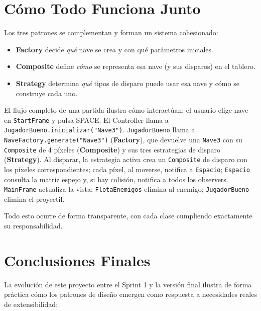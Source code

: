 \documentclass[12pt, a4paper]{article}
\begin{document}
\section{C\'{o}mo Todo Funciona Junto}
 
Los tres patrones se complementan y forman un sistema cohesionado:
 
\begin{itemize}
    \item \textbf{Factory} decide \textit{qu\'{e}} nave se crea y con qu\'{e} par\'{a}metros iniciales.
    \item \textbf{Composite} define \textit{c\'{o}mo} se representa esa nave (y sus disparos) en el tablero.
    \item \textbf{Strategy} determina \textit{qu\'{e}} tipos de disparo puede usar esa nave y c\'{o}mo se construye cada uno.
\end{itemize}
 
El flujo completo de una partida ilustra c\'{o}mo interact\'{u}an: el usuario elige nave en \texttt{StartFrame} y pulsa SPACE. El Controller llama a \texttt{JugadorBueno.inicializar("Nave3")}. \texttt{JugadorBueno} llama a \texttt{NaveFactory.generate("Nave3")} (\textbf{Factory}), que devuelve una \texttt{Nave3} con su \texttt{Composite} de 4 p\'{i}xeles (\textbf{Composite}) y sus tres estrategias de disparo (\textbf{Strategy}). Al disparar, la estrategia activa crea un \texttt{Composite} de disparo con los p\'{i}xeles correspondientes; cada p\'{i}xel, al moverse, notifica a \texttt{Espacio}; \texttt{Espacio} consulta la matriz espejo y, si hay colisi\'{o}n, notifica a todos los observers. \texttt{MainFrame} actualiza la vista; \texttt{FlotaEnemigos} elimina al enemigo; \texttt{JugadorBueno} elimina el proyectil.
 
Todo esto ocurre de forma transparente, con cada clase cumpliendo exactamente su responsabilidad.
 
\section{Conclusiones Finales}
 
La evoluci\'{o}n de este proyecto entre el Sprint 1 y la versi\'{o}n final ilustra de forma pr\'{a}ctica c\'{o}mo los patrones de dise\~{n}o emergen como respuesta a necesidades reales de extensibilidad:
 
\end{document}
